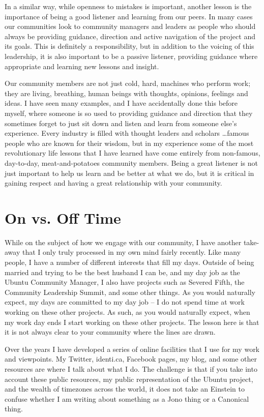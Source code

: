 In a similar way, while openness to mistakes is important, another lesson is the importance of being a good listener and learning from our peers. In many cases our communities look to community managers and leaders as people who should always be providing guidance, direction and active navigation of the project and its goals. This is definitely a responsibility, but in addition to the voicing of this leadership, it is also important to be a passive listener, providing guidance where appropriate and learning new lessons and insight.

Our community members are not just cold, hard, machines who perform work; they are living, breathing, human beings with thoughts, opinions, feelings and ideas. I have seen many examples, and I have accidentally done this before myself, where someone is so used to providing guidance and direction that they sometimes forget to just sit down and listen and learn from someone else’s experience. Every industry is filled with thought leaders and scholars \dots famous people who are known for their wisdom, but in my experience some of the most revolutionary life lessons that I have learned have come entirely from non-famous, day-to-day, meat-and-potatoes community members. Being a great listener is not just important to help us learn and be better at what we do, but it is critical in gaining respect and having a great relationship with your community.

\section*{On vs. Off Time}

While on the subject of how we engage with our community, I have another take-away that I only truly processed in my own mind fairly recently. Like many people, I have a number of different interests that fill my days. Outside of being married and trying to be the best husband I can be, and my day job as the Ubuntu Community Manager, I also have projects such as Severed Fifth, the Community Leadership Summit, and some other things. As you would naturally expect, my days are committed to my day job -- I do not spend time at work working on these other projects. As such, as you would naturally expect, when my work day ends I start working on these other projects. The lesson here is that it is not always clear to your community where the lines are drawn.

Over the years I have developed a series of online facilities that I use for my work and viewpoints. My Twitter, identi.ca, Facebook pages, my blog, and some other resources are where I talk about what I do. The challenge is that if you take into account these public resources, my public representation of the Ubuntu project, and the wealth of timezones across the world, it does not take an Einstein to confuse whether I am writing about something as a Jono thing or a Canonical thing.

